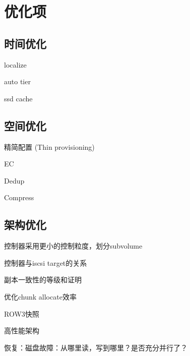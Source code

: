 \chapter{优化项}

\section{时间优化}

\begin{enumbox}
\item localize
\item auto tier
\item ssd cache
\end{enumbox}

\section{空间优化}

\begin{enumbox}
\item 精简配置 (Thin provisioning)
\item EC
\item Dedup
\item Compress
\end{enumbox}

\section{架构优化}

控制器采用更小的控制粒度，划分subvolume

控制器与iscsi target的关系

副本一致性的等级和证明

优化chunk allocate效率

ROW3快照

高性能架构

恢复：磁盘故障：从哪里读，写到哪里？是否充分并行了？

